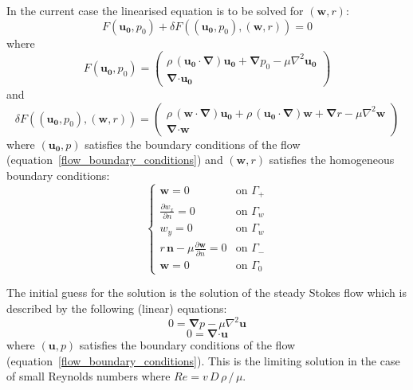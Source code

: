 \documentclass[12pt, a4paper]{article}
\begin{document}
    In the current case the linearised equation is to be solved for $(\mathbf{w}, r)$:
    \begin{equation}
    F(\mathbf{u_0}, p_0) + \delta F((\mathbf{u_0}, p_0), (\mathbf{w}, r)) = 0
    \end{equation}
    where
    \begin{equation}
    F(\mathbf{u_0}, p_0) =
    \begin{pmatrix}
    \rho \, (\mathbf{u_0 \cdot} \boldsymbol{\nabla}) \mathbf{u_0} + 
    \boldsymbol{\nabla} p_0 - 
    \mu \nabla^2 \mathbf{u_0} \\
    \boldsymbol{\nabla} \mathbf{\cdot u_0}
    \end{pmatrix}
    \end{equation}
    and
    \begin{equation}
    \delta F((\mathbf{u_0}, p_0), (\mathbf{w}, r)) = 
    \begin{pmatrix}
    \rho \, (\mathbf{w \cdot} \boldsymbol{\nabla}) \mathbf{u_0} + 
    \rho \, (\mathbf{u_0 \cdot} \boldsymbol{\nabla}) \mathbf{w} + 
    \boldsymbol{\nabla} r - 
    \mu \nabla^2 \mathbf{w} \\
    \boldsymbol{\nabla} \mathbf{\cdot w}
    \end{pmatrix}
    \end{equation}
    where $(\mathbf{u_0}, p)$ satisfies the boundary conditions of the flow (equation~\ref{flow_boundary_conditions}) and $(\mathbf{w}, r)$ satisfies the homogeneous boundary conditions:
    \begin{equation} \label{homogeneous_flow_boundary_conditions}
    \begin{cases}
    \mathbf{w} = 0 & \text{on } \Gamma_+ \\
    \frac{\partial w_x}{\partial n} = 0 & \text{on } \Gamma_w \\
    w_y = 0  & \text{on } \Gamma_w \\
    r \, \mathbf{n} - \mu \frac{\partial \mathbf{w}}{\partial n} = 0 & \text{on } \Gamma_- \\
    \mathbf{w} = 0 & \text{on } \Gamma_0
    \end{cases}
    \end{equation}
    
    The initial guess for the solution is the solution of the steady Stokes flow which is described by the following (linear) equations:
    \begin{equation} \label{Stokes_1}
    0 =\boldsymbol{\nabla} p - \mu \nabla^2 \mathbf{u}
    \end{equation}
    \begin{equation} \label{Stokes_2}
    0 = \boldsymbol{\nabla} \mathbf{\cdot u}
    \end{equation}
    where $(\mathbf{u}, p)$ satisfies the boundary conditions of the flow (equation~\ref{flow_boundary_conditions}). This is the limiting solution in the case of small Reynolds numbers where $Re = v \, D \, \rho \, / \, \mu$.
    
\end{document}
